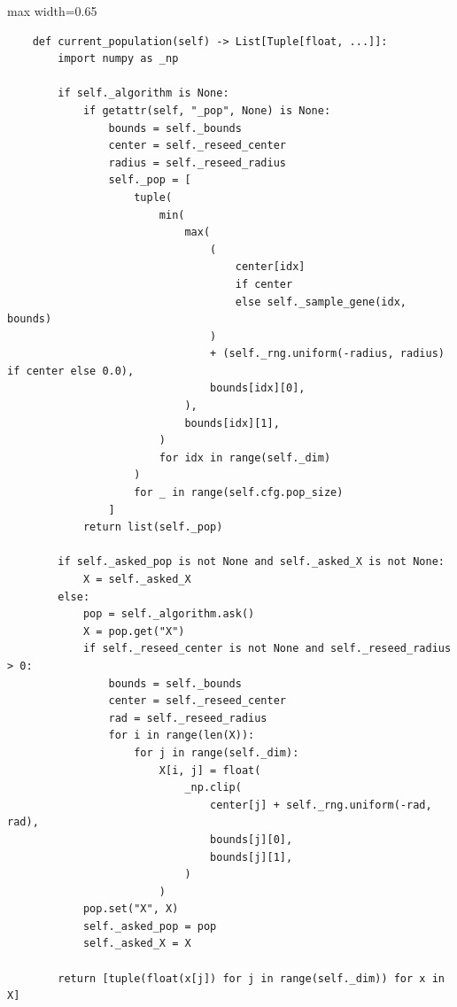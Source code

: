 \begin{listing}[H]
\caption{Bloque de código de \texttt{current\_population}}
\begin{adjustbox}{max width=0.65\textwidth}
\begin{minipage}{\textwidth}
\begin{verbatim}
    def current_population(self) -> List[Tuple[float, ...]]:
        import numpy as _np

        if self._algorithm is None:
            if getattr(self, "_pop", None) is None:
                bounds = self._bounds
                center = self._reseed_center
                radius = self._reseed_radius
                self._pop = [
                    tuple(
                        min(
                            max(
                                (
                                    center[idx]
                                    if center
                                    else self._sample_gene(idx, bounds)
                                )
                                + (self._rng.uniform(-radius, radius) if center else 0.0),
                                bounds[idx][0],
                            ),
                            bounds[idx][1],
                        )
                        for idx in range(self._dim)
                    )
                    for _ in range(self.cfg.pop_size)
                ]
            return list(self._pop)

        if self._asked_pop is not None and self._asked_X is not None:
            X = self._asked_X
        else:
            pop = self._algorithm.ask()
            X = pop.get("X")
            if self._reseed_center is not None and self._reseed_radius > 0:
                bounds = self._bounds
                center = self._reseed_center
                rad = self._reseed_radius
                for i in range(len(X)):
                    for j in range(self._dim):
                        X[i, j] = float(
                            _np.clip(
                                center[j] + self._rng.uniform(-rad, rad),
                                bounds[j][0],
                                bounds[j][1],
                            )
                        )
            pop.set("X", X)
            self._asked_pop = pop
            self._asked_X = X

        return [tuple(float(x[j]) for j in range(self._dim)) for x in X]
\end{verbatim}
\end{minipage}
\end{adjustbox}
\end{listing}


